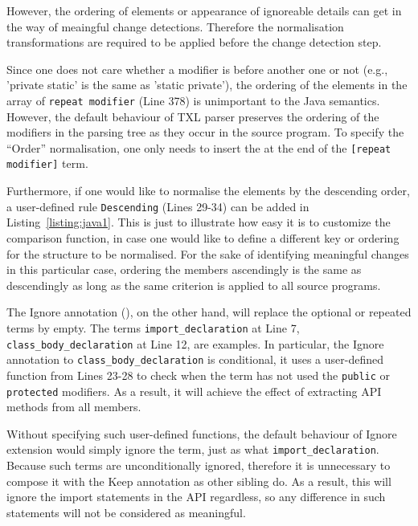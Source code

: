 \documentclass[10pt, conference, compsocconf]{IEEEtran}
\begin{document}
However, the ordering of elements or appearance of ignoreable details can get in the way of meaingful change detections. Therefore the normalisation transformations are required to be applied before the change detection step. 

Since one does not care whether a modifier is before another one or not (e.g., 'private static' is the same as 'static private'), the ordering of the elements in the array of {\tt repeat modifier}  (Line 378) is unimportant to the Java semantics. However, the default behaviour of TXL parser preserves the ordering of the modifiers in the parsing tree as they occur in the source program. To specify the ``Order'' normalisation, one only needs to insert the  at the end of the {\tt [repeat modifier]} term.

Furthermore, if one would like to normalise the elements by the descending order, a user-defined rule {\tt Descending} (Lines 29-34) can be added in Listing~\ref{listing:java1}. This is just to illustrate how easy it is to customize the comparison function, in case one would like to define a different key or ordering for the structure to be normalised. For the sake of identifying meaningful changes in this particular case, ordering the members ascendingly is the same as descendingly as long as the same criterion is applied to all source programs.

The Ignore annotation (), on the other hand, will replace the optional or repeated terms by empty. The terms {\tt import\_declaration} at Line 7, {\tt class\_body\_declaration} at Line 12, are examples. In particular, the Ignore annotation to {\tt class\_body\_declaration} is conditional, it uses a user-defined function from Lines 23-28 to check when the term has not used the {\tt public} or {\tt protected} modifiers. As a result, it will achieve the effect of extracting API methods from all members. 

Without specifying such user-defined functions, the default behaviour of Ignore extension would simply ignore the term, just as what {\tt import\_declaration}. Because such terms are unconditionally ignored, therefore it is unnecessary to compose it with the Keep annotation as other sibling do. As a result, this will ignore the import statements in the API regardless, so any difference in such statements will not be considered as meaningful.
\end{document}

